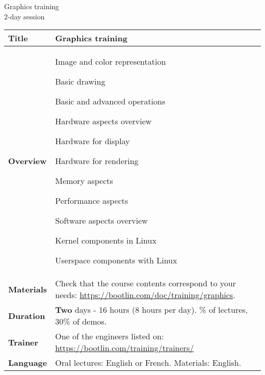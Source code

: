 \documentclass[a4paper,12pt,obeyspaces,spaces,hyphens]{article}
\begin{document}
\thispagestyle{fancy}

\setlength{\arrayrulewidth}{0.8pt}

\begin{center}
\LARGE
Graphics training\\
\large
2-day session
\end{center}
\vspace{1cm}

\small
{}

 {
  \begin{tabularx}{\textwidth}{|g|h|}
    {\bf Title} & {\bf Graphics training} \\
    \hline

    {\bf Overview} &
    Image and color representation \par
    Basic drawing \par
    Basic and advanced operations \par
    Hardware aspects overview \par
    Hardware for display \par
    Hardware for rendering \par
    Memory aspects \par
    Performance aspects \par
    Software aspects overview \par
    Kernel components in Linux \par
    Userspace components with Linux\\
    \hline
    {\bf Materials} &
    Check that the course contents correspond to your needs:
    \newline \url{https://bootlin.com/doc/training/graphics}. \\
    \hline

    {\bf Duration} & {\bf Two} days - 16 hours (8 hours per day).
    \% of lectures, 30\% of demos. \\
    \hline

    {\bf Trainer} & One of the engineers listed on:
    \newline \url{https://bootlin.com/training/trainers/}\\
    \hline

    {\bf Language} & Oral lectures: English or French.
    \newline Materials: English.\\
    \hline


\end{tabularx}}
\end{document}
